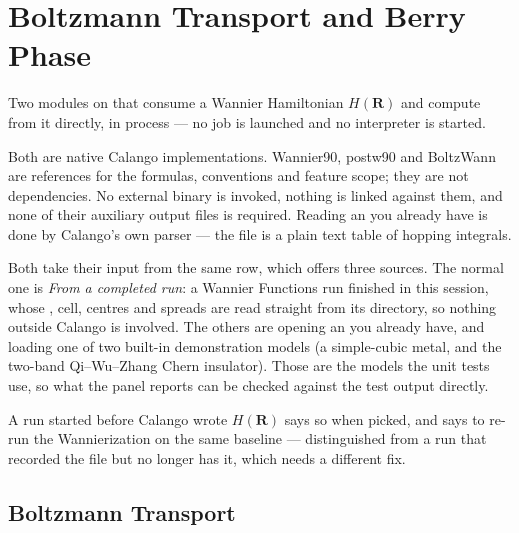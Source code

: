 \chapter{Boltzmann Transport and Berry Phase}
\label{ch:wannier-transport-berry}

Two modules on  that consume a Wannier Hamiltonian
$H(\mathbf{R})$ and compute from it directly, in process --- no job is
launched and no interpreter is started.

\begin{calnote}
Both are native Calango implementations. Wannier90, postw90 and BoltzWann are
references for the formulas, conventions and feature scope; they are not
dependencies. No external binary is invoked, nothing is linked against them,
and none of their auxiliary output files is required. Reading an
 you already have is done by Calango's own parser --- the file
is a plain text table of hopping integrals.
\end{calnote}

Both take their input from the same row, which offers three sources. The
normal one is \emph{From a completed run}: a Wannier Functions run finished in
this session, whose , cell, centres and spreads are read
straight from its directory, so nothing outside Calango is involved. The others
are opening an  you already have, and loading one of two
built-in demonstration models (a simple-cubic metal, and the two-band
Qi--Wu--Zhang Chern insulator). Those are the models the unit tests use, so
what the panel reports can be checked against the test output directly.

A run started before Calango wrote $H(\mathbf{R})$ says so when picked, and
says to re-run the Wannierization on the same baseline --- distinguished from a
run that recorded the file but no longer has it, which needs a different fix.

\section{Boltzmann Transport}

\menusep{}

